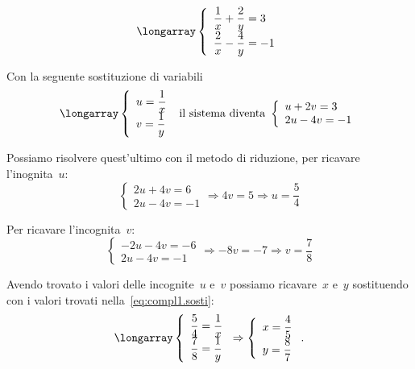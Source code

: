 \begin{exrig}
 \begin{esempio}
\[\longarray\left\{\begin{array}{l}
  \dfrac{1}{x}+\dfrac{2}{y}=3\\
  \dfrac{2}{x}-\dfrac{4}{y}=-1 
\end{array}\right.\]

 
Con la seguente sostituzione di variabili
\label{eq:compl1.sosti}
\[\longarray\left\{\begin{array}{l}
  u=\dfrac{1}{x}\\
  v=\dfrac{1}{y}
\end{array}\right.
 \text{ il sistema diventa }
\left\{\begin{array}{l}
  u+2v=3 \\
  2u-4v=-1 
\end{array}\right.\]


Possiamo risolvere quest'ultimo con il metodo di riduzione, 
per ricavare l'inognita~$u$:
\[\left\{\begin{array}{l}
2u+4v=6 \\
2u-4v=-1
\end{array}\right. \Rightarrow 4v=5 \Rightarrow u=\frac{5}{4}\]

Per ricavare l'incognita~$v$:
\[\left\{\begin{array}{l}
-2u-4v=-6 \\
2u-4v=-1 \end{array}\right. \Rightarrow -8v=-7 \Rightarrow v=\frac{7}{8}\]

Avendo trovato i valori delle incognite~$u$ e~$v$ possiamo ricavare~$x$ 
e~$y$ sostituendo con i valori trovati nella~\ref{eq:compl1.sosti}:
\[\longarray\left\{\begin{array}{l}
  \dfrac{5}{4}=\dfrac{1}{x}\\
  \dfrac{7}{8}=\dfrac{1}{y}
\end{array}\right.
\Rightarrow
\left\{\begin{array}{l}
  x=\dfrac{4}{5}\\
  y=\dfrac{8}{7}
\end{array}\right..\]
 \end{esempio}
\end{exrig}

